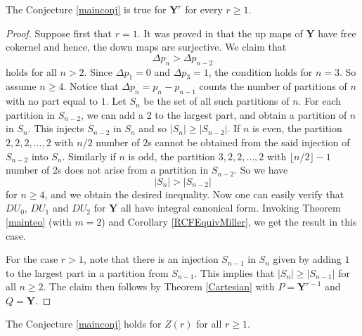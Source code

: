 \documentclass[ALCO, Unicode]{cedram}
\begin{document}
\begin{corollary}   The Conjecture \ref{mainconj} is true for $ \mathbf{Y}^{r} $ for every $ r \geq 1  $.
\end{corollary}  
\begin{proof} Suppose first that $ r = 1 $.   It was proved in \cite[\S   6.1]{Miller} that the up maps of  $     \mathbf{Y}  $ have free cokernel and hence, the down maps are surjective. We claim that $$ \Delta p_{n}  >  \Delta p_{ n - 2} $$ holds for  all $ n > 2  $.  
Since $  \Delta  p_{1} =    0  $ and $ \Delta p_{3} = 1 $, the condition  holds for $ n = 3 $.    So assume $ n \geq   4 $.  Notice that $ \Delta p_{n} = p_{n} - p_{n-1} $ counts the number of partitions of $  n $ with no part equal to $ 1 $. Let $ S_{n} $ be the set of all such partitions     of $n $. For each partition in $ S_{n-2} $, we can add a $ 2 $ to the largest part, and obtain a partition of $  n    $    in                                                      $ S_{n} $. This injects $ S_{n-2} $ in $ S_{n} $ and so $ |S_{n} |  \geq  | S_{n-2} |.  $   If $ n $ is even, the partition $ 2, 2, 2, \ldots, 2 $ with $ n/2 $ number of $ 2 $s cannot be obtained from the said injection of $ S_{n-2} $ into $S_{n} $. Similarly if  $ n $ is odd, the partition $ 3, 2, 2, \ldots, 2      $ with $ \lfloor n/2 \rfloor    -   1      $ number of $ 2 $s does not arise from a partition in  $  S_{n-2} $.  So  we have $$ | S_{n} |  > |  S_{n-2}  |   $$ for $ n  \geq  4                                                             $, and we obtain the desired inequality. 
Now one can easily verify that $ DU_{0} $, $ DU_{1} $ and $ DU_{2} $ for $ \mathbf{Y} $  all have integral canonical form. Invoking Theorem \ref{mainteo} (with $ m =  2$)  and Corollary    \ref{RCFEquivMiller}, we get the result in this  case.                                            


For the case  $ r > 1 $, note that there is an injection $ S_{n-1} $ in $ S_{n} $ given by adding $   1  $ to the largest part in a partition from $ S_{n-1} $. This  implies that   $ |S_{n}| \geq |S_{n-1}| $ for all $ n \geq 2 $. The claim then  follows by Theorem \ref{Cartesian} with $ P =  \mathbf{Y}^{r-1} $ and  $ Q = \mathbf{Y} $. 
\end{proof}    

\begin{corollary}   The Conjecture \ref{mainconj}     holds for $ Z(r) $ for all $ r \geq 1 $.   \end{corollary}   
\end{document}
